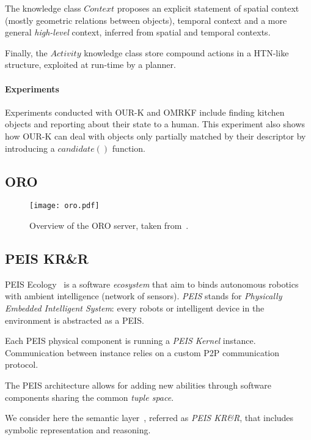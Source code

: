 \documentclass{IEEEtran}
\begin{document}
The knowledge class $Context$ proposes an explicit statement of spatial context
(mostly geometric relations between objects), temporal context and a more
general \emph{high-level} context, inferred from spatial and temporal contexts.

Finally, the $Activity$ knowledge class store compound actions in a HTN-like
structure, exploited at run-time by a planner.


\paragraph{Experiments} Experiments conducted with OUR-K and OMRKF include
finding kitchen objects and reporting about their state to a human.  This
experiment also shows how OUR-K can deal with objects only partially matched by
their descriptor by introducing a $candidate()$ function.

\subsection{ORO}
\label{sect|oro}

\begin{figure}
    \centering
    \texttt{[image: oro.pdf]}

    \caption{Overview of the ORO server, taken from~\cite{Lemaignan2012}.}

    \label{fig|oro}
\end{figure}

\subsection{PEIS KR\&R}
\label{sect|peis-ecology}

{\sc PEIS Ecology}~\cite{Saffiotti2005} is a software \emph{ecosystem} that aim
to binds autonomous robotics with ambient intelligence (network of sensors).
\emph{PEIS} stands for \emph{Physically Embedded Intelligent System}: every
robots or intelligent device in the environment is abstracted as a PEIS.

Each PEIS physical component is running a \emph{PEIS Kernel} instance.
Communication between instance relies on a custom P2P communication protocol.

The PEIS architecture allows for adding new abilities through software
components sharing the common \emph{tuple space}.

We consider here the semantic layer~\cite{Daoutis2009}, referred as \emph{PEIS
KR\&R}, that includes symbolic representation and reasoning.
\end{document}
